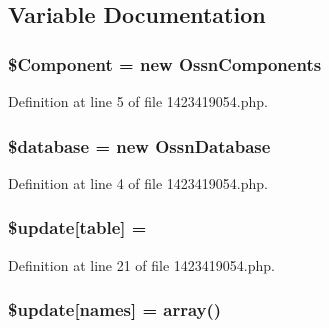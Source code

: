 \subsection{Variable Documentation}
\subsubsection[{\texorpdfstring{\$\+Component}{$Component}}]{\setlength{\rightskip}{0pt plus 5cm}\$Component = new {\bf Ossn\+Components}}\hypertarget{1423419054_8php_a02ea7567c10bfaae8b945a600a9f2de1}{}\label{1423419054_8php_a02ea7567c10bfaae8b945a600a9f2de1}


Definition at line 5 of file 1423419054.\+php.

\subsubsection[{\texorpdfstring{\$database}{$database}}]{\setlength{\rightskip}{0pt plus 5cm}\${\bf database} = new {\bf Ossn\+Database}}\hypertarget{1423419054_8php_a7691c0162d89de0b6ba47edcd8ba8878}{}\label{1423419054_8php_a7691c0162d89de0b6ba47edcd8ba8878}


Definition at line 4 of file 1423419054.\+php.

\subsubsection[{\texorpdfstring{\$update}{$update}}]{\setlength{\rightskip}{0pt plus 5cm}\${\bf update}\mbox{[}\textquotesingle{}table\textquotesingle{}\mbox{]} = \textquotesingle{}}\hypertarget{1423419054_8php_aee7ba5985ddf023a93862ab77e9718f9}{}\label{1423419054_8php_aee7ba5985ddf023a93862ab77e9718f9}


Definition at line 21 of file 1423419054.\+php.

\subsubsection[{\texorpdfstring{\$update}{$update}}]{\setlength{\rightskip}{0pt plus 5cm}\${\bf update}\mbox{[}\textquotesingle{}names\textquotesingle{}\mbox{]} = array(\textquotesingle{})}\hypertarget{1423419054_8php_abcf5ad2e4fef35de04bef0168cc91ddc}{}\label{1423419054_8php_abcf5ad2e4fef35de04bef0168cc91ddc}


